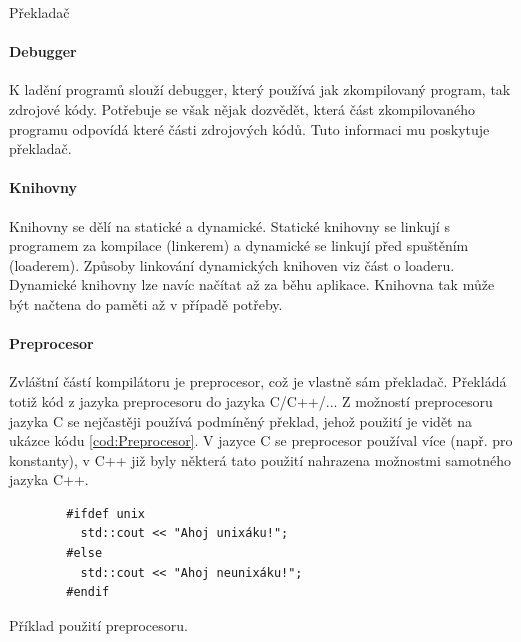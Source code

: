 \begin{definiceN}{Překladač}
\paragraph{Debugger}
K ladění programů slouží debugger, který používá jak zkompilovaný program, tak zdrojové kódy. Potřebuje se však nějak dozvědět, která část zkompilovaného programu odpovídá které části zdrojových kódů. Tuto informaci mu poskytuje překladač.

\paragraph{Knihovny}
Knihovny se dělí na statické a dynamické. Statické knihovny se linkují s programem za kompilace (linkerem) a dynamické se linkují před spuštěním (loaderem). Způsoby linkování dynamických knihoven viz část o loaderu. Dynamické knihovny lze navíc načítat až za běhu aplikace. Knihovna tak může být načtena do paměti až v případě potřeby.

\paragraph{Preprocesor}
Zvláštní částí kompilátoru je preprocesor, což je vlastně sám překladač. Překládá totiž kód z jazyka preprocesoru do jazyka C/C++/... Z možností preprocesoru jazyka C se nejčastěji používá podmíněný překlad, jehož použití je vidět na ukázce kódu \ref{cod:Preprocesor}. V jazyce C se preprocesor používal více (např. pro konstanty), v C++ již byly některá tato použití nahrazena možnostmi samotného jazyka C++.
\begin{kod}[h]
	\begin{verbatim}
		#ifdef unix
		  std::cout << "Ahoj unixáku!";
		#else
		  std::cout << "Ahoj neunixáku!";
		#endif
	\end{verbatim}
	\caption{Příklad použití preprocesoru.}
	\label{cod:Preprocesor}
\end{kod}



\end{definiceN}
